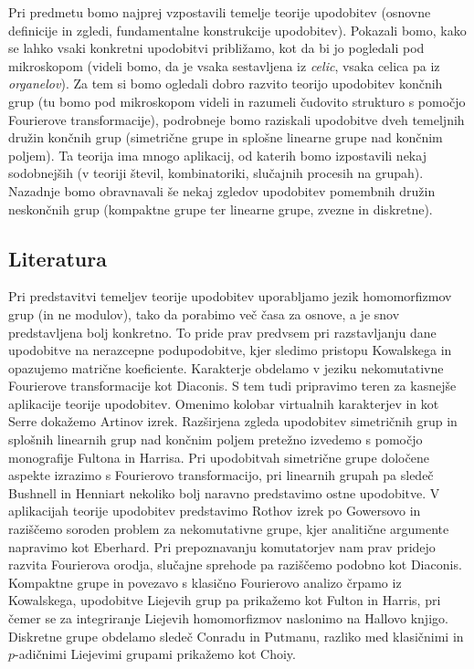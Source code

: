 \documentclass[11pt]{book}
\theoremstyle{definition}
\theoremstyle{zgled}
\theoremstyle{odprtproblem}
\theoremstyle{domacanaloga}
\theoremstyle{izrek}
\begin{document}
Pri predmetu bomo najprej vzpostavili temelje teorije upodobitev (osnovne definicije in zgledi, fundamentalne konstrukcije upodobitev). Pokazali bomo, kako se lahko vsaki konkretni upodobitvi približamo, kot da bi jo pogledali pod mikroskopom (videli bomo, da je vsaka sestavljena iz \emph{celic}, vsaka celica pa iz \emph{organelov}). Za tem si bomo ogledali dobro razvito teorijo upodobitev končnih grup (tu bomo pod mikroskopom videli in razumeli čudovito strukturo s pomočjo Fourierove transformacije), podrobneje bomo raziskali upodobitve dveh temeljnih družin končnih grup (simetrične grupe in splošne linearne grupe nad končnim poljem). Ta teorija ima mnogo aplikacij, od katerih bomo izpostavili nekaj sodobnejših (v teoriji števil, kombinatoriki, slučajnih procesih na grupah). Nazadnje bomo obravnavali še nekaj zgledov upodobitev pomembnih družin neskončnih grup (kompaktne grupe ter linearne grupe, zvezne in diskretne).


\newpage

\subsection*{Literatura}

Pri predstavitvi temeljev teorije upodobitev uporabljamo jezik homomorfizmov grup (in ne modulov), tako da porabimo več časa za osnove, a je snov predstavljena bolj konkretno. To pride prav predvsem pri razstavljanju dane upodobitve na nerazcepne podupodobitve, kjer sledimo pristopu Kowalskega in opazujemo matrične koeficiente. Karakterje obdelamo v jeziku nekomutativne Fourierove transformacije kot Diaconis. S tem tudi pripravimo teren za kasnejše aplikacije teorije upodobitev. Omenimo kolobar virtualnih karakterjev in kot Serre dokažemo Artinov izrek. Razširjena zgleda upodobitev simetričnih grup in splošnih linearnih grup nad končnim poljem pretežno izvedemo s pomočjo monografije Fultona in Harrisa. Pri upodobitvah simetrične grupe določene aspekte izrazimo s Fourierovo transformacijo, pri linearnih grupah pa sledeč Bushnell in Henniart nekoliko bolj naravno predstavimo ostne upodobitve. V aplikacijah teorije upodobitev predstavimo Rothov izrek po Gowersovo in raziščemo soroden problem za nekomutativne grupe, kjer analitične argumente napravimo kot Eberhard. Pri prepoznavanju komutatorjev nam prav pridejo razvita Fourierova orodja, slučajne sprehode pa raziščemo podobno kot Diaconis. Kompaktne grupe in povezavo s klasično Fourierovo analizo črpamo iz Kowalskega, upodobitve Liejevih grup pa prikažemo kot Fulton in Harris, pri čemer se za integriranje Liejevih homomorfizmov naslonimo na Hallovo knjigo. Diskretne grupe obdelamo sledeč Conradu in Putmanu, razliko med klasičnimi in $p$-adičnimi Liejevimi grupami prikažemo kot Choiy.
\end{document}
